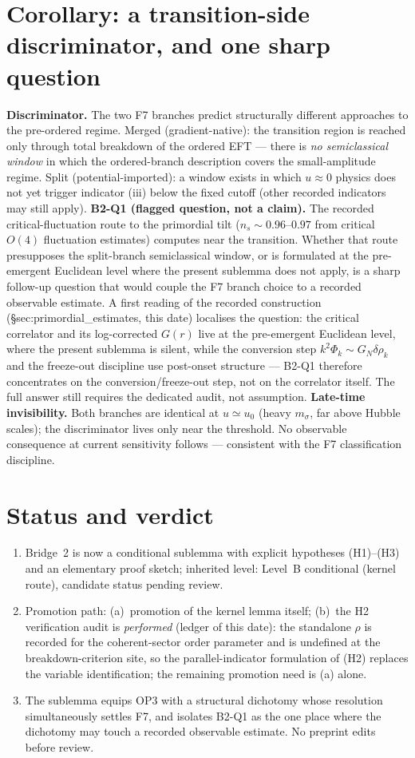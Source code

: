 \documentclass[11pt,a4paper]{article}
\begin{document}
\section{Corollary: a transition-side discriminator, and one sharp question}
\textbf{Discriminator.} The two F7 branches predict structurally different
approaches to the pre-ordered regime. Merged (gradient-native): the
transition region is reached only through total breakdown of the ordered
EFT --- there is \emph{no semiclassical window} in which the ordered-branch
description covers the small-amplitude regime. Split (potential-imported):
a window exists in which $u\approx0$ physics does not yet trigger
indicator (iii) below the fixed cutoff (other recorded indicators may still
apply).
\textbf{B2-Q1 (flagged question, not a claim).} The recorded
critical-fluctuation route to the primordial tilt ($n_s\sim0.96$--$0.97$
from critical $O(4)$ fluctuation estimates) computes near the transition.
Whether that route presupposes the split-branch semiclassical window, or is
formulated at the pre-emergent Euclidean level where the present sublemma
does not apply, is a sharp follow-up question that would couple the F7
branch choice to a recorded observable estimate. A first reading of the
recorded construction (\S sec:primordial\_estimates, this date) localises
the question: the critical correlator and its log-corrected $G(r)$ live at
the pre-emergent Euclidean level, where the present sublemma is silent,
while the conversion step $k^2\Phi_k\sim G_N\delta\rho_k$ and the
freeze-out discipline use post-onset structure --- B2-Q1 therefore
concentrates on the conversion/freeze-out step, not on the correlator
itself. The full answer still requires the dedicated audit, not assumption.
\textbf{Late-time invisibility.} Both branches are identical at $u\simeq
u_0$ (heavy $m_\sigma$, far above Hubble scales); the discriminator lives
only near the threshold. No observable consequence at current sensitivity
follows --- consistent with the F7 classification discipline.

\section{Status and verdict}
\begin{enumerate}[leftmargin=1.9em,itemsep=2pt,label=\textbf{V\arabic*.}]
\item Bridge~2 is now a conditional sublemma with explicit hypotheses
(H1)--(H3) and an elementary proof sketch; inherited level: Level~B
conditional (kernel route), candidate status pending review.
\item Promotion path: (a)~promotion of the kernel lemma itself;
(b)~the H2 verification audit is \emph{performed} (ledger of this date):
the standalone $\rho$ is recorded for the coherent-sector order parameter
and is undefined at the breakdown-criterion site, so the parallel-indicator
formulation of (H2) replaces the variable identification; the remaining
promotion need is (a) alone.
\item The sublemma equips OP3 with a structural dichotomy whose resolution
simultaneously settles F7, and isolates B2-Q1 as the one place where the
dichotomy may touch a recorded observable estimate. No preprint edits
before review.
\end{enumerate}
\end{document}
